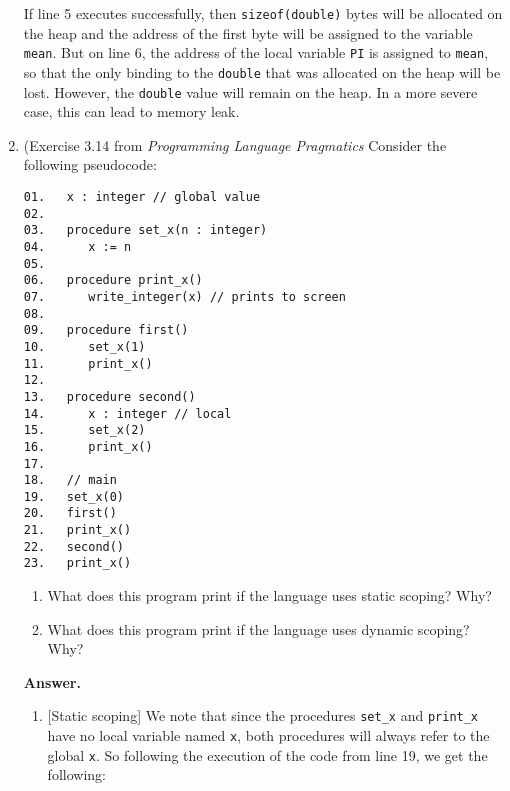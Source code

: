 \documentclass[9pt]{article}
\begin{document}
\begin{enumerate}
If line 5 executes successfully, then \verb|sizeof(double)| bytes will be 
allocated on the heap and the address of the first byte will be assigned to the
variable \verb|mean|. But on line 6, the address of the local variable \verb|PI| 
is assigned to \verb|mean|, so that the only binding to the \verb|double| that 
was allocated on the heap will be lost. However, the \verb|double| value will 
remain on the heap. In a more severe case, this can lead to memory leak.
   \item (Exercise 3.14 from \textit{Programming Language Pragmatics} Consider
         the following pseudocode:
         \begin{verbatim}
01.   x : integer // global value
02.
03.   procedure set_x(n : integer)
04.      x := n
05.
06.   procedure print_x()
07.      write_integer(x) // prints to screen
08.
09.   procedure first()
10.      set_x(1)
11.      print_x()
12.
13.   procedure second()
14.      x : integer // local
15.      set_x(2)
16.      print_x()
17.
18.   // main
19.   set_x(0)
20.   first()
21.   print_x()
22.   second()
23.   print_x()
         \end{verbatim}

         \begin{enumerate}
            \item What does this program print if the language uses static 
                  scoping? Why?
            \item What does this program print if the language uses dynamic
                  scoping? Why?
         \end{enumerate}

      \textbf{Answer.}

      \begin{enumerate}
         \item {[}Static scoping{]} We note that since the procedures
               \verb|set_x| and \verb|print_x| have no local variable named 
               \verb|x|, both procedures will always refer to the global
               \verb|x|. So following the execution of the code from line 19, we 
               get the following:


\end{enumerate}
\end{enumerate}
\end{document}
